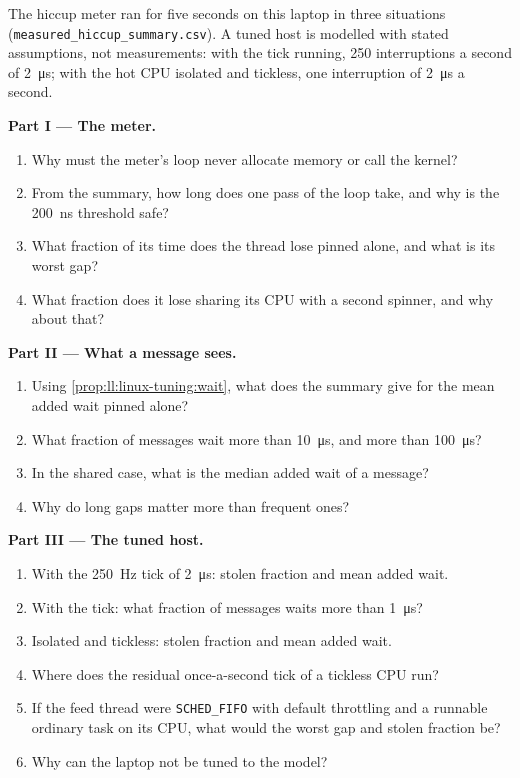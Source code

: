 \begin{problem}\label{pb:ll:linux-tuning:1}
The hiccup meter ran for five seconds on this laptop in three situations
(\texttt{measured\_hiccup\_summary.csv}). A tuned host is modelled with stated assumptions, not measurements: with the tick
running, 250 interruptions a second of \qty{2}{\micro\second}; with the hot CPU isolated and tickless, one interruption of
\qty{2}{\micro\second} a second.

\medskip\noindent\textbf{Part I --- The meter.}
\begin{enumerate}
\item Why must the meter's loop never allocate memory or call the kernel?
\item From the summary, how long does one pass of the loop take, and why is the \qty{200}{\nano\second} threshold safe?
\item What fraction of its time does the thread lose pinned alone, and what is its worst gap?
\item What fraction does it lose sharing its CPU with a second spinner, and why about that?
\end{enumerate}

\medskip\noindent\textbf{Part II --- What a message sees.}
\begin{enumerate}[resume]
\item Using \cref{prop:ll:linux-tuning:wait}, what does the summary give for the mean added wait pinned alone?
\item What fraction of messages wait more than \qty{10}{\micro\second}, and more than \qty{100}{\micro\second}?
\item In the shared case, what is the median added wait of a message?
\item Why do long gaps matter more than frequent ones?
\end{enumerate}

\medskip\noindent\textbf{Part III --- The tuned host.}
\begin{enumerate}[resume]
\item With the 250~Hz tick of \qty{2}{\micro\second}: stolen fraction and mean added wait.
\item With the tick: what fraction of messages waits more than \qty{1}{\micro\second}?
\item Isolated and tickless: stolen fraction and mean added wait.
\item Where does the residual once-a-second tick of a tickless CPU run?
\item If the feed thread were \texttt{SCHED\_FIFO} with default throttling and a runnable ordinary task on its CPU, what
would the worst gap and stolen fraction be?
\item Why can the laptop not be tuned to the model?
\end{enumerate}


\end{problem}
